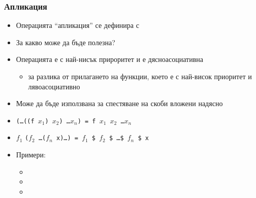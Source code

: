 \documentclass{beamer}
\begin{document}
\begin{frame}
  \frametitle{Апликация}

  \begin{itemize}[<+->]
  \item Операцията ``апликация'' се дефинира с 
  \item За какво може да бъде полезна?
  \item Операцията \lst{$} е с най-нисък прироритет и е дясноасоциативна
    \begin{itemize}
    \item за разлика от прилагането на функции, което е с най-висок приоритет и лявоасоциативно
    \end{itemize}
  \item Може да бъде използвана за спестяване на скоби вложени надясно
  \item \tt(\ldots\tt{((f} $x_1$\tt) $x_2$\tt) \ldots $x_n$\tt) = \tt f $x_1$ $x_2$ \ldots $x_n$
  \item $f_1$ \tt($f_2$ \ldots \tt($f_n$ \tt{x)}\ldots\tt) = $f_1$ \tt\$ $f_2$ \tt\$ \ldots \tt\$ $f_n$ \tt{\$ x}
  \item Примери:
    \begin{itemize}
    \item {}
    \item {}
    \item {}
    \end{itemize}
  \end{itemize}
\end{frame}
\end{document}
